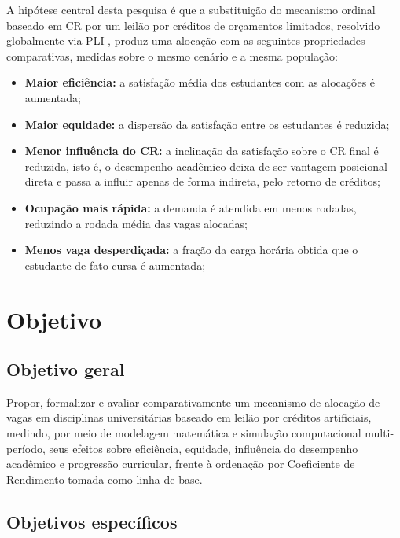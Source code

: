 \documentclass[
    12pt,
    openany,
    oneside,
    a4paper,
    english,
    brazil
]{abntex2}
\begin{document}
A hipótese central desta pesquisa é que a substituição do mecanismo ordinal baseado em CR por um leilão por créditos de orçamentos limitados, resolvido globalmente via PLI \cite{wolsey1998}, produz uma alocação com as seguintes propriedades comparativas, medidas sobre o mesmo cenário e a mesma população:

\begin{itemize}
    \item \textbf{Maior eficiência:} a satisfação média dos estudantes com as alocações é aumentada;
    \item \textbf{Maior equidade:} a dispersão da satisfação entre os estudantes é reduzida;
    \item \textbf{Menor influência do CR:} a inclinação da satisfação sobre o CR final é reduzida, isto é, o desempenho acadêmico deixa de ser vantagem posicional direta e passa a influir apenas de forma indireta, pelo retorno de créditos;
    \item \textbf{Ocupação mais rápida:} a demanda é atendida em menos rodadas, reduzindo a rodada média das vagas alocadas;
    \item \textbf{Menos vaga desperdiçada:} a fração da carga horária obtida que o estudante de fato cursa é aumentada;
\end{itemize}

\section{Objetivo}
\label{sec:objetivo}

\subsection{Objetivo geral}

Propor, formalizar e avaliar comparativamente um mecanismo de alocação de vagas em disciplinas universitárias baseado em leilão por créditos artificiais, medindo, por meio de modelagem matemática e simulação computacional multi-período, seus efeitos sobre eficiência, equidade, influência do desempenho acadêmico e progressão curricular, frente à ordenação por Coeficiente de Rendimento tomada como linha de base.

\subsection{Objetivos específicos}
\end{document}

